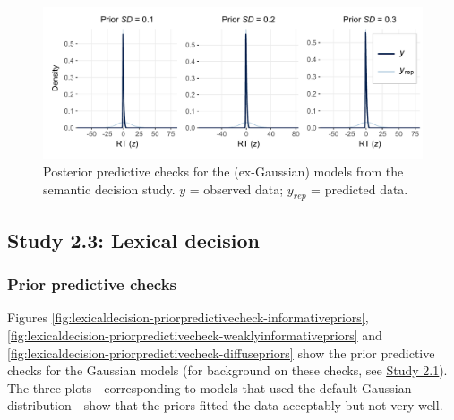 \documentclass[
  12pt,
  man,floatsintext]{apa7}
\begin{document}
\begin{figure}

{\centering \includegraphics[width=1\linewidth]{../semanticdecision/bayesian_analysis/posterior_predictive_checks/plots/semanticdecision_posteriorpredictivechecks_allpriors_exgaussian} 

}

\caption{Posterior predictive checks for the (ex-Gaussian) models from the semantic decision study. \(y\) = observed data; \(y_{rep}\) = predicted data.}\label{fig:semanticdecision-posteriorpredictivechecks-allpriors-exgaussian}
\end{figure}

\hypertarget{study-2.3-lexical-decision-2}{%
\subsection{Study 2.3: Lexical decision}\label{study-2.3-lexical-decision-2}}

\hypertarget{prior-predictive-checks-2}{%
\subsubsection{Prior predictive checks}\label{prior-predictive-checks-2}}

Figures \ref{fig:lexicaldecision-priorpredictivecheck-informativepriors}, \ref{fig:lexicaldecision-priorpredictivecheck-weaklyinformativepriors} and \ref{fig:lexicaldecision-priorpredictivecheck-diffusepriors} show the prior predictive checks for the Gaussian models (for background on these checks, see \protect\hyperlink{study1-bayesian-diagnostics}{\underline{Study 2.1}}). The three plots---corresponding to models that used the default Gaussian distribution---show that the priors fitted the data acceptably but not very well.
\end{document}
